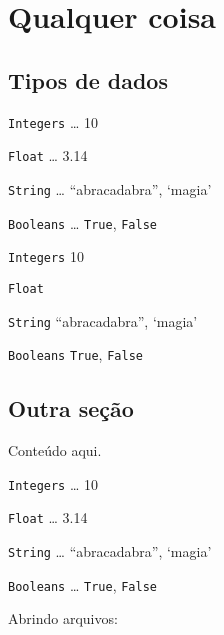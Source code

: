 \documentclass{article}
\begin{document}
\section{Qualquer coisa}

\begin{multicols*}{4}




\begin{leftbar}
\hypertarget{tipos-de-dados}{%
\subsection*{Tipos de dados}\label{tipos-de-dados}}




\texttt{Integers} \ldots{} 10

\texttt{Float} \ldots{} 3.14

\texttt{String} \ldots{} ``abracadabra'', `magia'

\texttt{Booleans} \ldots{} \texttt{True}, \texttt{False}

\end{leftbar}

\begin{mdframed}[backgroundcolor=gray!20]
\texttt{Integers} \hfill 10

\texttt{Float} 

\texttt{String} \hrulefill ``abracadabra'', `magia'

\texttt{Booleans} \hfill \texttt{True}, \texttt{False}

\end{mdframed}

\subsectionfont{\color{Grey}}

\subsection*{Outra seção}

\color{DarkGrey}

Conteúdo aqui.


\texttt{Integers} \ldots{} 10

\texttt{Float} \ldots{} 3.14

\texttt{String} \ldots{} ``abracadabra'', `magia'

\texttt{Booleans} \ldots{} \texttt{True}, \texttt{False}

Abrindo arquivos:


\end{multicols*}
\end{document}
